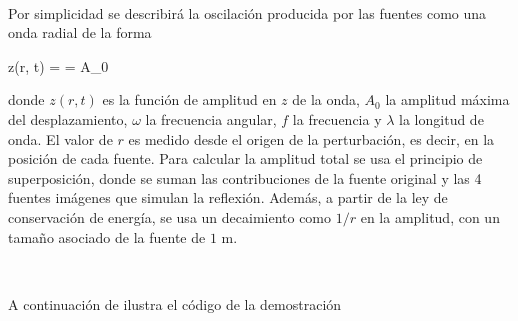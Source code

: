 \

Por simplicidad se describirá la oscilación producida por las fuentes 
como una onda radial de la forma

{z(r, t) = \sin{} = 
A_0\sin{}}

donde $z(r, t)$ es la función de amplitud en $z$ de la onda, $A_0$ la 
amplitud máxima del desplazamiento, $\omega$ la frecuencia angular, $f$ la 
frecuencia y $\lambda$ la longitud de onda. El valor de $r$ es medido 
desde el origen de la perturbación, es decir, en la posición de cada fuente.
Para calcular la amplitud total se usa el principio de superposición, donde
se suman las contribuciones de la fuente original y las 4 fuentes imágenes
que simulan la reflexión. Además, a partir de la ley de conservación de
energía, se usa un decaimiento como $1/r$ en la amplitud, con un tamaño 
asociado de la fuente de $1$ m.

\

A continuación de ilustra el código de la demostración


